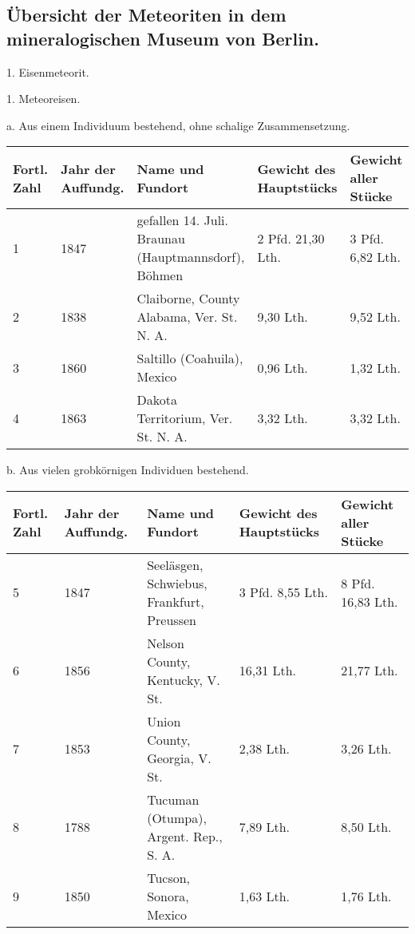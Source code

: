 \documentclass[a4paper, 11pt, oneside]{article}
\begin{document}
\subsection{Übersicht der Meteoriten in dem mineralogischen Museum von Berlin.}
\begin{center}
1. Eisenmeteorit.
\end{center}
\begin{center}
1. Meteoreisen.
\end{center}
\begin{center}
a. Aus einem Individuum bestehend, ohne schalige Zusammensetzung.
\end{center}
\begin{center}
\begin{footnotesize}
\begin{tabular}{ |p{7mm}|p{9mm}|p{45mm}|p{23mm}|p{20mm}| }
    \hline
    Fortl. Zahl & Jahr der Auffundg. & Name und Fundort & Gewicht des Hauptstücks & Gewicht aller Stücke\\
    \hline\hline
    1 & 1847 & gefallen 14. Juli. Braunau (Hauptmannsdorf), Böhmen & 2 Pfd. 21,30 Lth. & 3 Pfd. 6,82 Lth.\\\hline
    2 & 1838 & Claiborne, County Alabama, Ver. St. N. A. & 9,30 Lth. & 9,52 Lth.\\\hline
    3 & 1860 & Saltillo (Coahuila), Mexico & 0,96 Lth. & 1,32 Lth.\\\hline
    4 & 1863 & Dakota Territorium, Ver. St. N. A. & 3,32 Lth. & 3,32 Lth.\\
    \hline
\end{tabular}
\end{footnotesize}
\end{center}
\begin{center}
b. Aus vielen grobkörnigen Individuen bestehend.
\end{center}
\begin{center}
\begin{footnotesize}
\begin{tabular}{ |p{7mm}|p{9mm}|p{45mm}|p{20mm}|p{23mm}| }
    \hline
    Fortl. Zahl & Jahr der Auffundg. & Name und Fundort & Gewicht des Hauptstücks & Gewicht aller Stücke\\
    \hline\hline
    5 & 1847 & Seeläsgen, Schwiebus, Frankfurt, Preussen & 3 Pfd. 8,55 Lth. & 8 Pfd. 16,83 Lth.\\\hline
    6 & 1856 & Nelson County, Kentucky, V. St. & 16,31 Lth. & 21,77 Lth.\\\hline
    7 & 1853 & Union County, Georgia, V. St. & 2,38 Lth. & 3,26 Lth.\\\hline
    8 & 1788 & Tucuman (Otumpa), Argent. Rep., S. A. & 7,89 Lth. & 8,50 Lth.\\\hline
    9 & 1850 & Tucson, Sonora, Mexico & 1,63 Lth. & 1,76 Lth.\\
    \hline
\end{tabular}
\end{footnotesize}
\end{center}
\end{document}
